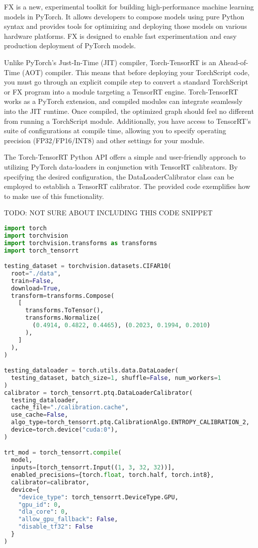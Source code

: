 FX is a new, experimental toolkit for building high-performance machine learning models in PyTorch. It allows developers to compose models using pure Python syntax and provides tools for optimizing and deploying those models on various hardware platforms. FX is designed to enable fast experimentation and easy production deployment of PyTorch models.

Unlike PyTorch's Just-In-Time (JIT) compiler, Torch-TensorRT is an Ahead-of-Time (AOT) compiler. This means that before deploying your TorchScript code, you must go through an explicit compile step to convert a standard TorchScript or FX program into a module targeting a TensorRT engine. Torch-TensorRT works as a PyTorch extension, and compiled modules can integrate seamlessly into the JIT runtime. Once compiled, the optimized graph should feel no different from running a TorchScript module. Additionally, you have access to TensorRT's suite of configurations at compile time, allowing you to specify operating precision (FP32/FP16/INT8) and other settings for your module.

The Torch-TensorRT Python API offers a simple and user-friendly approach to utilizing PyTorch data-loaders in conjunction with TensorRT calibrators. By specifying the desired configuration, the DataLoaderCalibrator class can be employed to establish a TensorRT calibrator. The provided code exemplifies how to make use of this functionality.

TODO: NOT SURE ABOUT INCLUDING THIS CODE SNIPPET
\begin{lstlisting}[language=Python]
import torch
import torchvision
import torchvision.transforms as transforms
import torch_tensorrt

testing_dataset = torchvision.datasets.CIFAR10(
  root="./data",
  train=False,
  download=True,
  transform=transforms.Compose(
    [
      transforms.ToTensor(),
      transforms.Normalize(
        (0.4914, 0.4822, 0.4465), (0.2023, 0.1994, 0.2010)
      ),
    ]
  ),
)

testing_dataloader = torch.utils.data.DataLoader(
  testing_dataset, batch_size=1, shuffle=False, num_workers=1
)
calibrator = torch_tensorrt.ptq.DataLoaderCalibrator(
  testing_dataloader,
  cache_file="./calibration.cache",
  use_cache=False,
  algo_type=torch_tensorrt.ptq.CalibrationAlgo.ENTROPY_CALIBRATION_2,
  device=torch.device("cuda:0"),
)

trt_mod = torch_tensorrt.compile(
  model,
  inputs=[torch_tensorrt.Input((1, 3, 32, 32))],
  enabled_precisions={torch.float, torch.half, torch.int8},
  calibrator=calibrator,
  device={
    "device_type": torch_tensorrt.DeviceType.GPU,
    "gpu_id": 0,
    "dla_core": 0,
    "allow_gpu_fallback": False,
    "disable_tf32": False
  }
)
\end{lstlisting}

